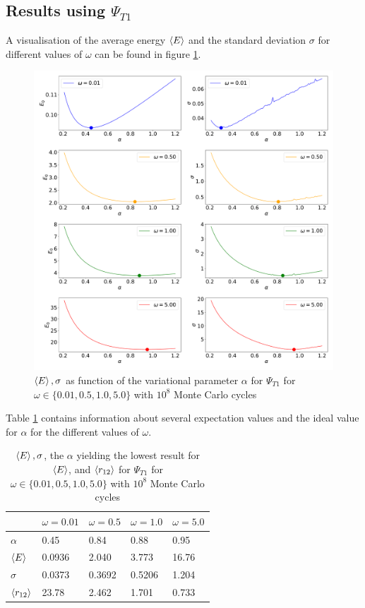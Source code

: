 \documentclass[10pt,a4paper]{article}
\begin{document}
\subsection{Results using $\Psi_{T1}$}
A visualisation of the average energy $\braket{E}$ and the standard deviation $\sigma$ for different values of $\omega$ can be found in figure \ref{function1_plot}. 
\begin{figure}[H]
\centering
\includegraphics[width=\textwidth]{function1_plot.pdf}
\caption[$\braket{E},\sigma$ as function of $\alpha$]{$\braket{E},\sigma$ as function of the variational parameter $\alpha$ for $\Psi_{T1}$ for $\omega\in\{0.01,0.5,1.0,5.0\}$ with $10^8$ Monte Carlo cycles}\label{function1_plot}
\end{figure}
Table \ref{table1} contains information about several expectation values and the ideal value for $\alpha$ for the different values of $\omega$.
\begin{table}[H]
\centering
\caption[$\braket{E},\sigma$, $\alpha$ and $\braket{r_{12}}$]{$\braket{E},\sigma$, the $\alpha$ yielding the lowest result for  $\braket{E}$, and $\braket{r_{12}}$ for $\Psi_{T1}$ for $\omega\in\{0.01,0.5,1.0,5.0\}$ with $10^8$ Monte Carlo cycles}
\begin{tabular}{|l|l|l|l|l|}
\hline
                  & $\omega=0.01$ & $\omega=0.5$ & $\omega=1.0$ & $\omega=5.0$ \\ \hline
$\alpha$          & 0.45          & 0.84         & 0.88         & 0.95         \\ \hline
$\braket{E}$      & 0.0936        & 2.040        & 3.773        & 16.76        \\ \hline
$\sigma$          & 0.0373        & 0.3692       & 0.5206       & 1.204        \\ \hline
$\braket{r_{12}}$ & 23.78         & 2.462        & 1.701        & 0.733        \\ \hline
\end{tabular}\label{table1}
\end{table}
\end{document}
